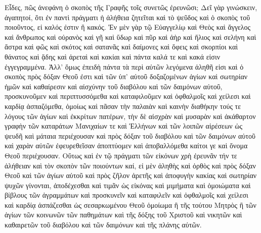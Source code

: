 \documentclass[10pt]{book}
\newcommand{\switchGreek}[1][]{\selectlanguage{polutonikogreek} \switchcolumn*[#1]}
\newcommand{\switchEnglish}{\selectlanguage{english} \switchcolumn}
\begin{document}
\begin{paracol}{2}
\switchGreek

Εἶδες, πῶς ἀνεφάνη ὁ σκοπὸς τῆς Γραφῆς τοῖς συνετῶς ἐρευνῶσι; Δεῖ γὰρ
γινώσκειν, ἀγαπητοί, ὅτι ἐν παντὶ πράγματι ἡ ἀλήθεια ζητεῖται καὶ τὸ ψεῦδος
καὶ ὁ σκοπὸς τοῦ ποιοῦντος, εἰ καλός ἐστιν ἢ κακός. Ἐν μὲν γὰρ τῷ Εὐαγγελίῳ
καὶ Θεὸς καὶ ἄγγελος καὶ ἄνθρωπος καὶ οὐρανὸς καὶ γῆ καὶ ὕδωρ καὶ πῦρ καὶ ἀὴρ
καὶ ἥλιος καὶ σελήνη καὶ ἄστρα καὶ φῶς καὶ σκότος καὶ σατανᾶς καὶ δαίμονες καὶ
ὄφεις καὶ σκορπίοι καὶ θάνατος καὶ ᾅδης καὶ ἀρεταὶ καὶ κακίαι καὶ πάντα καλά
τε καὶ κακά εἰσιν ἐγγεγραμμένα. Ἀλλ’ ὅμως ἐπειδὴ πάντα τὰ περὶ αὐτῶν λεγόμενα
ἀληθῆ εἰσι καὶ ὁ σκοπὸς πρὸς δόξαν Θεοῦ ἐστι καὶ τῶν ὑπ’ αὐτοῦ δοξαζομένων
ἁγίων καὶ σωτηρίαν ἡμῶν καὶ καθαίρεσιν καὶ αἰσχύνην τοῦ διαβόλου καὶ τῶν
δαιμόνων αὐτοῦ, προσκυνοῦμεν καὶ περιπτυσσόμεθα καὶ καταφιλοῦμεν καὶ ὀφθαλμοῖς
καὶ χείλεσι καὶ καρδίᾳ ἀσπαζόμεθα, ὁμοίως καὶ πᾶσαν τὴν παλαιὰν καὶ καινὴν
διαθήκην τούς τε λόγους τῶν ἁγίων καὶ ἐκκρίτων πατέρων, τὴν δὲ αἰσχρὰν καὶ
μυσαρὰν καὶ ἀκάθαρτον γραφὴν τῶν καταράτων Μανιχαίων τε καὶ Ἑλλήνων καὶ τῶν
λοιπῶν αἱρέσεων ὡς ψευδῆ καὶ μάταια περιέχουσαν καὶ πρὸς δόξαν τοῦ διαβόλου
καὶ τῶν δαιμόνων αὐτοῦ καὶ χαρὰν αὐτῶν ἐφευρεθεῖσαν ἀποπτύομεν καὶ
ἀποβαλλόμεθα καίτοι γε καὶ ὄνομα Θεοῦ περιέχουσαν. Οὕτως καὶ ἐν τῷ πράγματι
τῶν εἰκόνων χρὴ ἐρευνᾶν τήν τε ἀλήθειαν καὶ τὸν σκοπὸν τῶν ποιούντων καί, εἰ
μὲν ἀληθὴς καὶ ὀρθὸς καὶ πρὸς δόξαν Θεοῦ καὶ τῶν ἁγίων αὐτοῦ καὶ πρὸς ζῆλον
ἀρετῆς καὶ ἀποφυγὴν κακίας καὶ σωτηρίαν ψυχῶν γίνονται, ἀποδέχεσθαι καὶ τιμᾶν
ὡς εἰκόνας καὶ μιμήματα καὶ ὁμοιώματα καὶ βίβλους τῶν ἀγραμμάτων καὶ
προσκυνεῖν καὶ καταφιλεῖν καὶ ὀφθαλμοῖς καὶ χείλεσι καὶ καρδίᾳ ἀσπάζεσθαι ὡς
σεσαρκωμένου Θεοῦ ὁμοίωμα ἢ τῆς τούτου Μητρὸς ἢ τῶν ἁγίων τῶν κοινωνῶν τῶν
παθημάτων καὶ τῆς δόξης τοῦ Χριστοῦ καὶ νικητῶν καὶ καθαιρετῶν τοῦ διαβόλου
καὶ τῶν δαιμόνων καὶ τῆς πλάνης αὐτῶν.

\switchEnglish


\end{paracol}
\end{document}
